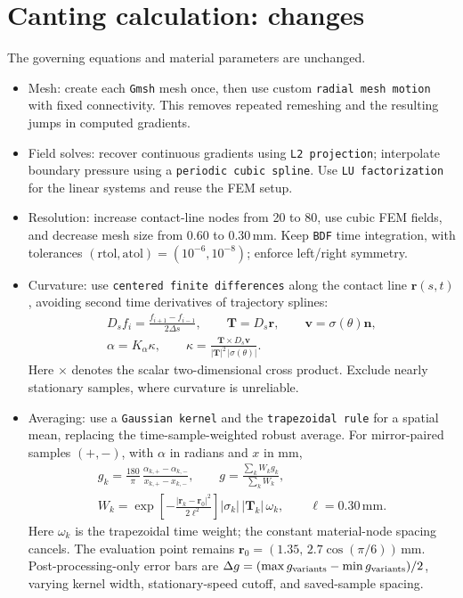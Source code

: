 \documentclass[11pt]{article}
\begin{document}
\section*{Canting calculation: changes}
The governing equations and material parameters are unchanged.

\begin{itemize}
\setlength{\itemsep}{0.6em}

\item Mesh: create each \verb|Gmsh| mesh once, then use custom
\verb|radial mesh motion| with fixed connectivity. This removes repeated
remeshing and the resulting jumps in computed gradients.

\item Field solves: recover continuous gradients using \verb|L2 projection|;
interpolate boundary pressure using a \verb|periodic cubic spline|.
Use \verb|LU factorization| for the linear systems and reuse the FEM setup.

\item Resolution: increase contact-line nodes from 20 to 80, use cubic FEM
fields, and decrease mesh size from $0.60$ to $0.30\,\mathrm{mm}$.
Keep \verb|BDF| time integration, with tolerances
$(\mathrm{rtol},\mathrm{atol})=(10^{-6},10^{-8})$; enforce left/right symmetry.

\item Curvature: use \verb|centered finite differences| along the contact line
$\mathbf r(s,t)$, avoiding second time derivatives of trajectory splines:
\begin{gather*}
  D_s f_i=\frac{f_{i+1}-f_{i-1}}{2\Delta s},\qquad
  \mathbf T=D_s\mathbf r,\qquad
  \mathbf v=\sigma(\theta)\mathbf n,\\
  \alpha=K_\alpha\kappa,\qquad
  \kappa=\frac{\mathbf T\times D_s\mathbf v}
                    {|\mathbf T|^2\,|\sigma(\theta)|}.
\end{gather*}
Here $\times$ denotes the scalar two-dimensional cross product.
Exclude nearly stationary samples, where curvature is unreliable.

\item Averaging: use a \verb|Gaussian kernel| and the \verb|trapezoidal rule|
for a spatial mean, replacing the time-sample-weighted robust average.
For mirror-paired samples $(+,-)$, with $\alpha$ in radians and $x$ in mm,
\begin{gather*}
  g_k=\frac{180}{\pi}\,
       \frac{\alpha_{k,+}-\alpha_{k,-}}{x_{k,+}-x_{k,-}},\qquad
  g=\frac{\sum_k W_k g_k}{\sum_k W_k},\\
  W_k=\exp\!\left[-\frac{|\mathbf r_k-\mathbf r_0|^2}{2\ell^2}\right]
      |\sigma_k|\,|\mathbf T_k|\,\omega_k,
  \qquad \ell=0.30\,\mathrm{mm}.
\end{gather*}
Here $\omega_k$ is the trapezoidal time weight; the constant material-node
spacing cancels. The evaluation point remains
$\mathbf r_0=(1.35,\,2.7\cos(\pi/6))\,\mathrm{mm}$.
Post-processing-only error bars are
$\Delta g=(\max g_{\rm variants}-\min g_{\rm variants})/2$,
varying kernel width, stationary-speed cutoff, and saved-sample spacing.


\end{itemize}
\end{document}
